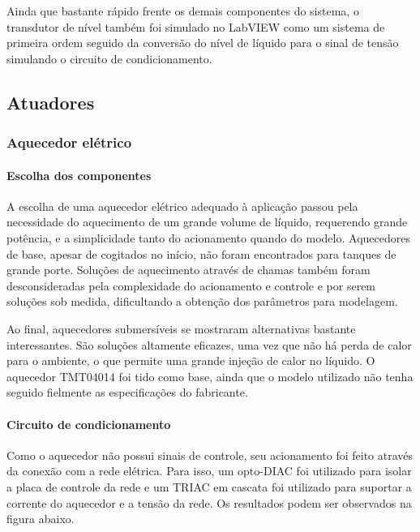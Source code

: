 Ainda que bastante rápido frente os demais componentes do sistema, o transdutor de nível também foi simulado no LabVIEW como um sistema de primeira ordem seguido da conversão do nível de líquido para o sinal de tensão simulando o circuito de condicionamento.

\subsection{Atuadores}

\subsubsection{Aquecedor elétrico}

\paragraph{Escolha dos componentes}\mbox{}

A escolha de uma aquecedor elétrico adequado à aplicação passou pela necessidade do aquecimento de um grande volume de líquido, requerendo grande potência, e a simplicidade tanto do acionamento quando do modelo. Aquecedores de base, apesar de cogitados no início, não foram encontrados para tanques de grande porte. Soluções de aquecimento através de chamas também foram desconsideradas pela complexidade do acionamento e controle e por serem soluções sob medida, dificultando a obtenção dos parâmetros para modelagem.

Ao final, aquecedores submersíveis se mostraram alternativas bastante interessantes. São soluções altamente eficazes, uma vez que não há perda de calor para o ambiente, o que permite uma grande injeção de calor no líquido. O aquecedor TMT04014 foi tido como base, ainda que o modelo utilizado não tenha seguido fielmente as especificações do fabricante.

\paragraph{Circuito de condicionamento}\mbox{}

Como o aquecedor não possui sinais de controle, seu acionamento foi feito através da conexão com a rede elétrica. Para isso, um opto-DIAC foi utilizado para isolar a placa de controle da rede e um TRIAC em cascata foi utilizado para suportar a corrente do aquecedor e a tensão da rede. Os resultados podem ser observados na figura abaixo.

